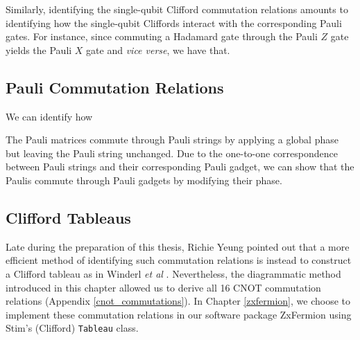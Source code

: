 
Similarly, identifying the single-qubit Clifford commutation relations amounts to identifying how the single-qubit Cliffords interact with the corresponding Pauli gates. For instance, since commuting a Hadamard gate through the Pauli $Z$ gate yields the Pauli $X$ gate and \textit{vice verse}, we have that.


\subsection{Pauli Commutation Relations}

We can identify how 

The Pauli matrices commute through Pauli strings by applying a global phase but leaving the Pauli string unchanged. Due to the one-to-one correspondence between Pauli strings and their corresponding Pauli gadget, we can show that the Paulis commute through Pauli gadgets by modifying their phase.


\subsection{Clifford Tableaus}

Late during the preparation of this thesis, Richie Yeung pointed out that a more efficient method of identifying such commutation relations is instead to construct a Clifford tableau as in Winderl \textit{et al} \cite{Yeung2023}. Nevertheless, the diagrammatic method introduced in this chapter allowed us to derive all 16 CNOT commutation relations (Appendix \ref{cnot_commutations}). In Chapter \ref{zxfermion}, we choose to implement these commutation relations in our software package ZxFermion using Stim's (Clifford) \lstinline{Tableau} class.
